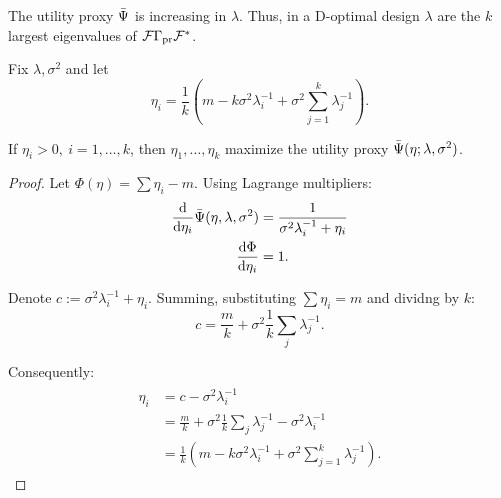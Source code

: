 \documentclass{amsart}
\numberwithin{equation}{section}
\begin{document}
\begin{observation}
  The utility proxy $\bar{\Psi}$ is increasing in $\lambda$. Thus, in
  a D-optimal design $\lambda$ are the $k$ largest eigenvalues of
  $\mathcal{F} \Gamma_{\textup{pr}} \mathcal{F}^*$.
\end{observation}

\begin{proposition}
  Fix $\lambda, \sigma^2$ and let
  $$
  \eta_i = \frac{1}{k} \left ( m - k \sigma^2 \lambda_i^{-1} + \sigma^2 \sum_{j=1}^k \lambda_j^{-1} \right ).
  $$

  If $\eta_i > 0,\ i=1,\dots, k$, then $\eta_1,\dots,\eta_k$ maximize
  the utility proxy $\bar{\Psi}(\eta; \lambda, \sigma^2)$.
\end{proposition}
\begin{proof}
  Let $\Phi(\eta) = \sum \eta_i - m$. Using Lagrange multipliers:
  \begin{align*}
    \begin{split}
      \frac{\text{\textup{d}}}{\text{\textup{d}} \eta_i} \bar{\Psi}(\eta, \lambda, \sigma^2) &=
      \frac{1}{\sigma^{2}\lambda_i^{-1} + \eta_i} \\
      \frac{\text{\textup{d}}\Phi}{\text{\textup{d}} \eta_i} &= 1.
    \end{split}
  \end{align*}

  Denote $c := \sigma^{2}\lambda_i^{-1} + \eta_i$. Summing,
  substituting $\sum \eta_i = m$ and dividng by $k$:
  $$
  c = \frac{m}{k} + \sigma^2 \frac{1}{k} \sum_j \lambda_j^{-1}.
  $$

  Consequently:
  \begin{align*}
    \begin{split}
      \eta_i &= c - \sigma^2 \lambda_i^{-1} \\
      &= \frac{m}{k} + \sigma^2 \frac{1}{k} \sum_j \lambda_j^{-1} - \sigma^2 \lambda_i^{-1} \\
      &= \frac{1}{k} \left ( m - k \sigma^2\lambda_i^{-1} + \sigma^2 \sum_{j=1}^k \lambda_j^{-1} \right ).
    \end{split}
  \end{align*}
\end{proof}


\end{document}

